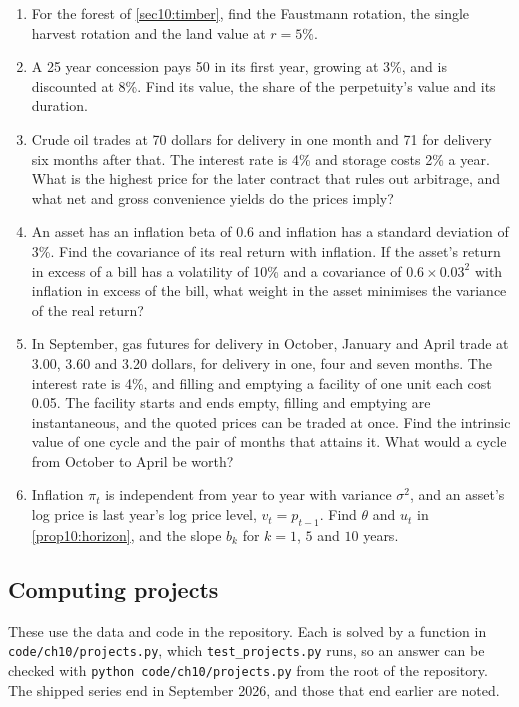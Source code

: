 \begin{chapterrefs}
\begin{enumerate}[label=\textbf{10.\arabic*}, ref=10.\arabic*, leftmargin=*]
  What is the sum of the slopes in a Dimson regression with the current market return and three lags?
  \item\label{exr10:eleven} For the forest of \cref{sec10:timber}, find the Faustmann rotation, the single
  harvest rotation and the land value at $r=5\%$.
  \item\label{exr10:twelve} A 25 year concession pays 50 in its first year, growing at 3\%, and is discounted
  at 8\%. Find its value, the share of the perpetuity's value and its duration.
  \item\label{exr10:thirteen} Crude oil trades at 70 dollars for delivery in one month and 71 for delivery
  six months after that. The interest rate is 4\% and storage costs 2\% a year. What is the highest
  price for the later contract that rules out arbitrage, and what net and gross convenience yields do the
  prices imply?
  \item\label{exr10:fourteen} An asset has an inflation beta of 0.6 and inflation has a standard deviation
  of 3\%. Find the covariance of its real return with inflation. If the asset's return in excess of a bill
  has a volatility of 10\% and a covariance of $0.6\times0.03^2$ with inflation in excess of the bill, what
  weight in the asset minimises the variance of the real return?
  \item\label{exr10:fifteen} In September, gas futures for delivery in October, January and April trade at
  3.00, 3.60 and 3.20 dollars, for delivery in one, four and seven months. The interest rate is 4\%, and
  filling and emptying a facility of one unit each cost 0.05. The facility starts and ends empty,
  filling and emptying are instantaneous, and the quoted prices can be traded at once. Find the intrinsic value of one cycle and the
  pair of months that attains it. What would a cycle from October to April be worth?
  \item\label{exr10:sixteen} Inflation $\pi_t$ is independent from year to year with variance
  $\sigma^2$, and an asset's log price is last year's log price level, $v_t=p_{t-1}$. Find $\theta$ and
  $u_t$ in \cref{prop10:horizon}, and the slope $b_k$ for $k=1$, $5$ and $10$ years.
\end{enumerate}

\subsection*{Computing projects}
\label{sec10:projects}
These use the data and code in the repository. Each is solved by a function in
\texttt{code/ch10/projects.py}, which \texttt{test\_projects.py} runs, so an answer can be
checked with \texttt{python code/ch10/projects.py} from the root of the repository. The
shipped series end in September 2026, and those that end earlier are noted.


\end{chapterrefs}
